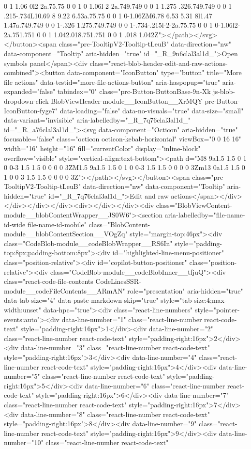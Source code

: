 {{{{{0 1 1.06 0l2 2a.75.75 0 0 1 0 1.06l-2 2a.749.749 0 0 1-1.275-.326.749.749 0 0 1 .215-.734L10.69 8 9.22 6.53a.75.75 0 0 1 0-1.06ZM6.78 6.53 5.31 8l1.47 1.47a.749.749 0 0 1-.326 1.275.749.749 0 0 1-.734-.215l-2-2a.75.75 0 0 1 0-1.06l2-2a.751.751 0 0 1 1.042.018.751.751 0 0 1 .018 1.042Z"></path></svg></button><span class="prc-TooltipV2-Tooltip-tLeuB" data-direction="nw" data-component="Tooltip" aria-hidden="true" id="_R_9n6clal3al1d_">Open symbols panel</span><div class="react-blob-header-edit-and-raw-actions-combined"><button data-component="IconButton" type="button" title="More file actions" data-testid="more-file-actions-button" aria-haspopup="true" aria-expanded="false" tabindex="0" class="prc-Button-ButtonBase-9n-Xk js-blob-dropdown-click BlobViewHeader-module__IconButton__XrMQY prc-Button-IconButton-fyge7" data-loading="false" data-no-visuals="true" data-size="small" data-variant="invisible" aria-labelledby="_R_7q76clal3al1d_" id="_R_a76clal3al1d_"><svg data-component="Octicon" aria-hidden="true" focusable="false" class="octicon octicon-kebab-horizontal" viewBox="0 0 16 16" width="16" height="16" fill="currentColor" display="inline-block" overflow="visible" style="vertical-align:text-bottom"><path d="M8 9a1.5 1.5 0 1 0 0-3 1.5 1.5 0 0 0 0 3ZM1.5 9a1.5 1.5 0 1 0 0-3 1.5 1.5 0 0 0 0 3Zm13 0a1.5 1.5 0 1 0 0-3 1.5 1.5 0 0 0 0 3Z"></path></svg></button><span class="prc-TooltipV2-Tooltip-tLeuB" data-direction="nw" data-component="Tooltip" aria-hidden="true" id="_R_7q76clal3al1d_">Edit and raw actions</span></div></div></div></div><div></div></div><div class="BlobViewContent-module__blobContentWrapper__JS0W6"><section aria-labelledby="file-name-id-wide file-name-id-mobile" class="BlobContent-module__blobContentSection__VOgZq" style="margin-top:46px"><div class="CodeBlob-module__codeBlobWrapper__RS6In" style="padding-top:8px;padding-bottom:8px"><div id="highlighted-line-menu-positioner" class="position-relative"><div id="copilot-button-positioner" class="position-relative"><div class="CodeBlob-module__codeBlobInner__tfjuQ"><div class="react-code-file-contents CodeLinesSSR-module__codeFileContents__ARmAN" role="presentation" aria-hidden="true" data-tab-size="4" data-paste-markdown-skip="true" style="tab-size:4;max-width:unset" data-hpc="true"><div class="react-line-numbers" style="pointer-events:auto"><div data-line-number="1" class="react-line-number react-code-text" style="padding-right:16px">1</div><div data-line-number="2" class="react-line-number react-code-text" style="padding-right:16px">2</div><div data-line-number="3" class="react-line-number react-code-text" style="padding-right:16px">3</div><div data-line-number="4" class="react-line-number react-code-text" style="padding-right:16px">4</div><div data-line-number="5" class="react-line-number react-code-text" style="padding-right:16px">5</div><div data-line-number="6" class="react-line-number react-code-text" style="padding-right:16px">6</div><div data-line-number="7" class="react-line-number react-code-text" style="padding-right:16px">7</div><div data-line-number="8" class="react-line-number react-code-text" style="padding-right:16px">8</div><div data-line-number="9" class="react-line-number react-code-text" style="padding-right:16px">9</div><div data-line-number="10" class="react-line-number react-code-text" }}}}}
